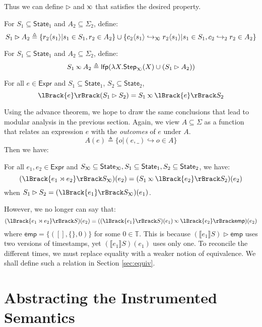\documentclass[acmsmall,screen,review]{acmart}\settopmatter{printfolios=true,printccs=false,printacmref=false}
\theoremstyle{acmdefinition}
\newcommand*{\Expr}{\mathsf{Expr}}
\newcommand*{\Time}{\mathbb{T}}
\newcommand*{\config}{c}
\newcommand*{\rightst}{r}
\newcommand*{\State}{\mathsf{State}}
\newcommand*{\lfp}{\mathsf{lfp}}
\newcommand*{\Step}{\mathsf{Step}}
\newcommand*{\semarrow}{\hookrightarrow}
\newcommand*{\semlink}{\mathbin{\rotatebox[origin=c]{180}{$\propto$}}}
\newcommand*{\link}[2]{{#1}\rtimes{#2}}
\newcommand*{\mt}{\mathsf{emp}}
\newcommand*{\sembracket}[1]{\lBrack{#1}\rBrack}
\newcommand*{\inject}[2]{{#2}\langle{#1}\rangle}
\begin{document}
Thus we can define $\rhd$ and $\semlink$ that satisfies the desired property.
\begin{definition}[Injection]
  For $S_1\subseteq\State_1$ and $A_2\subseteq\Sigma_2$, define:
  \[
    S_1\rhd A_2\triangleq\{\inject{s_1}{\rightst_2}|s_1\in S_1,\rightst_2\in A_2\}\cup\{\inject{s_1}{\config_2}\semarrow_{\semlink}\inject{s_1}{\rightst_2}|s_1\in S_1,\config_2\semarrow_2\rightst_2\in A_2\}
  \]
\end{definition}
\begin{definition}
  For $S_1\subseteq\State_1$ and $A_2\subseteq\Sigma_2$, define:
  \[
    S_1\semlink A_2\triangleq\lfp(\lambda X.\Step_{\semlink}(X)\cup(S_1\rhd A_2))
  \]
\end{definition}
\begin{theorem}[Advance]
  For all $e\in\Expr$ and $S_1\subseteq\State_1$, $S_2\subseteq\State_2$,
  \[
    \sembracket{e}(S_1\rhd S_2)=S_1\semlink\sembracket{e}S_2
  \]
\end{theorem}
Using the advance theorem, we hope to draw the same conclusions that lead to modular analysis in the previous section.
Again, we view $A\subseteq\Sigma$ as a function that relates an expression $e$ with the \emph{outcomes} of $e$ under $A$.
\[A(e)\triangleq\{o|(e,\_)\semarrow o\in A\}\]
Then we have:
\begin{corollary} For all $e_1,e_2\in\Expr$ and $S_{\semlink}\subseteq\State_{\semlink},S_1\subseteq\State_1,S_2\subseteq\State_2$, we have:
  \[(\sembracket{\link{e_1}{e_2}}S_{\semlink})(e_2)=(S_1\semlink\sembracket{e_2}S_2)(e_2)\]
  when $S_1\rhd S_2=(\sembracket{e_1}S_{\semlink})(e_1)$.
\end{corollary}
However, we no longer can say that:
\[(\sembracket{\link{e_1}{e_2}}S)(e_2)=((\sembracket{e_1}S)(e_1)\semlink\sembracket{e_2}\mt)(e_2)\]
where $\mt=\{([],\{\},0)\}$ for some $0\in\Time$.
This is because $(\sembracket{e_1}S)\rhd\mt$ uses two versions of timestamps, yet $(\sembracket{e_1}S)(e_1)$ uses only one.
To reconcile the different times, we must replace equality with a weaker notion of equivalence.
We shall define such a relation in Section \ref{sec:equiv}.
\section{Abstracting the Instrumented Semantics}
\end{document}

